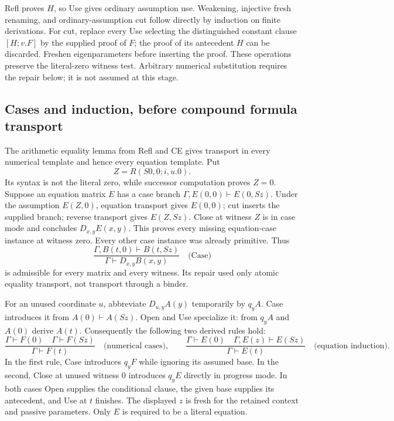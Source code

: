 \documentclass[10pt,letterpaper]{article}
\theoremstyle{definition}
\theoremstyle{remark}
\begin{document}
Refl proves $H$, so Use gives ordinary assumption use. Weakening,
injective fresh renaming, and ordinary-assumption cut follow directly by
induction on finite derivations. For cut, replace every Use selecting the
distinguished constant clause $[H;v.F]$ by the supplied proof of $F$;
the proof of its antecedent $H$ can be discarded. Freshen eigenparameters
before inserting the proof. These operations preserve the literal-zero
witness test. Arbitrary numerical substitution requires the repair below;
it is not assumed at this stage.

\subsection{Cases and induction, before compound formula transport}

The arithmetic equality lemma from Refl and CE gives transport in every
numerical template and hence every equation template. Put
\[
                 Z=R(S0,0;i,u.0).
\]
Its syntax is not the literal zero, while successor computation proves
$Z=0$. Suppose an equation matrix $E$ has a case branch
$\Gamma,E(0,0)\vdash E(0,Sz)$. Under the assumption $E(Z,0)$,
equation transport gives $E(0,0)$; cut inserts the supplied branch; reverse
transport gives $E(Z,Sz)$. Close at witness $Z$ is in case mode and
concludes $D_{x,y}E(x,y)$. This proves every missing equation-case instance
at witness zero. Every other case instance was already primitive. Thus
\[
 \frac{\Gamma,B(t,0)\vdash B(t,Sz)}
      {\Gamma\vdash D_{x,y}B(x,y)}\quad\text{(Case)}
\tag{Case}
\]
is admissible for every matrix and every witness. Its repair used only
atomic equality transport, not transport through a binder.

For an unused coordinate $u$, abbreviate $D_{u,y}A(y)$ temporarily by
$q_yA$. Case introduces it from $A(0)\vdash A(Sz)$. Open and Use
specialize it: from $q_yA$ and $A(0)$ derive $A(t)$.
Consequently the following two derived rules hold:
\[
 \frac{\Gamma\vdash F(0)\quad\Gamma\vdash F(Sz)}
      {\Gamma\vdash F(t)}\quad\text{(numerical cases)},
 \qquad
 \frac{\Gamma\vdash E(0)\quad\Gamma,E(z)\vdash E(Sz)}
      {\Gamma\vdash E(t)}\quad\text{(equation induction)}.
\tag{NC, EI}
\]
In the first rule, Case introduces $q_yF$ while ignoring its assumed base.
In the second, Close at unused witness $0$ introduces $q_yE$ directly
in progress mode. In both cases Open supplies the conditional clause,
the given base supplies its antecedent, and Use at $t$ finishes. The
displayed $z$ is fresh for the retained context and passive parameters.
Only $E$ is required to be a literal equation.
\end{document}
